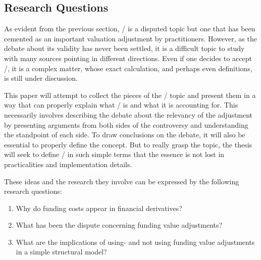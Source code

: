 \documentclass[main.tex]{subfiles}
\begin{document}
    \subsection{Research Questions}
        
    As evident from the previous section, \FVA/ is a disputed topic 
    but one that has been cemented as an important valuation adjustment by practitioners.
    However, as the debate about its validity has never been settled,
    it is a difficult topic to study with many sources pointing in different directions.
    Even if one decides to accept \FVA/, it is a complex matter,
    whose exact calculation, and perhaps even definitions, is still under discussion.

    This paper will attempt to collect the pieces of the \FVA/ topic
    and present them in a way that can properly explain what \FVA/ is and what it is accounting for.
    This necessarily involves describing the debate about the relevancy of the adjustment
    by presenting arguments from both sides of the controversy 
    and understanding the standpoint of each side.
    To draw conclusions on the debate, it will also be essential to properly define the concept.
    But to really grasp the topic, the thesis will seek to define \FVA/ in such simple terms 
    that the essence is not lost in practicalities and implementation details.

    These ideas and the research they involve can be expressed by the following research questions:
    \begin{enumerate}
        \item Why do funding costs appear in financial derivatives?
        \item What has been the dispute concerning funding value adjustments?
        \item What are the implications of using- and not using funding value adjustments 
              in a simple structural model?
    \end{enumerate}
\end{document}
